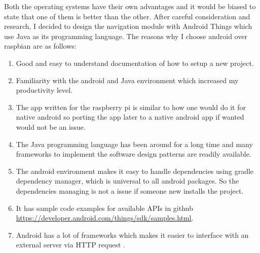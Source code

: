         \newpage 
        \par
            Both the operating systems have their own advantages and it would be biased to state that
            one of them is better than the other. After careful consideration and research, I
            decided to design the navigation module with Android Things which use Java as its
            programming language. The reasons why I choose android over raspbian are as follows:
            \begin{enumerate}
                \item 
                    Good and easy to understand documentation of how to setup 
                    a new project.
                \item 
                    Familiarity with the android and Java environment which increased my
                    productivity level.  
                \item 
                    The app written for the raspberry pi is similar to how one would
                    do it for native android so porting the app later to a native android
                    app if wanted would not be an issue. 
                \item 
                    The Java programming language has been around for a long time and many
                    frameworks to implement the software design patterns are readily 
                    available.
                \item 
                    The android environment makes it easy to handle dependencies using gradle
                    dependency manager, which is universal to all android packages. So the 
                    dependencies managing is not a issue if someone new installs the project.  
                \item
                    It has sample code examples for available APIs in github 
                    \url{https://developer.android.com/things/sdk/samples.html}. 
                \item
                    Android has a lot of frameworks which makes it easier to interface with an
                    external server via HTTP request \cite{http}.
            \end{enumerate}
    
